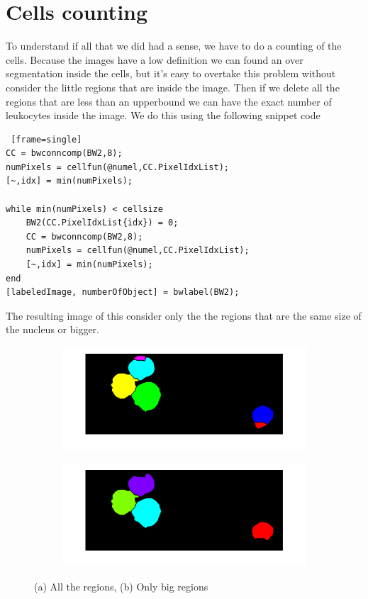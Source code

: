 \section{Cells counting}
To understand if all that we did had a sense, we have to do a counting of the cells. Because the images have a low definition we can found an over segmentation inside the cells, but it's easy to overtake this problem without consider the little regions that are inside the image. Then if we delete all the regions that are less than an upperbound we can have the exact number of leukocytes inside the image. We do this using the following snippet code
\begin{scriptsize}
	\begin{lstlisting} [frame=single]
CC = bwconncomp(BW2,8);
numPixels = cellfun(@numel,CC.PixelIdxList);
[~,idx] = min(numPixels);

while min(numPixels) < cellsize
    BW2(CC.PixelIdxList{idx}) = 0;
    CC = bwconncomp(BW2,8);
    numPixels = cellfun(@numel,CC.PixelIdxList);
    [~,idx] = min(numPixels);
end
[labeledImage, numberOfObject] = bwlabel(BW2);
	\end{lstlisting}
\end{scriptsize}
The resulting image of this consider only the the regions that are the same size of the nucleus or bigger.
\begin{figure}
	\centering
	\begin{subfigure}[b]{0.6\textwidth}
        \includegraphics[width=\textwidth]{img/celluleConCito.png}
        \caption{ }
        \label{fig:alltheregions}
    \end{subfigure}
    \begin{subfigure}[b]{0.6\textwidth}
		\includegraphics[width=\textwidth]{img/conteggioNuclei(noWatersheed).png}
		\caption{ }
		\label{fig:onlybigregions}
	\end{subfigure}
	\caption{(a) All the regions, (b) Only big regions}
	\label{fig:counting}
\end{figure}